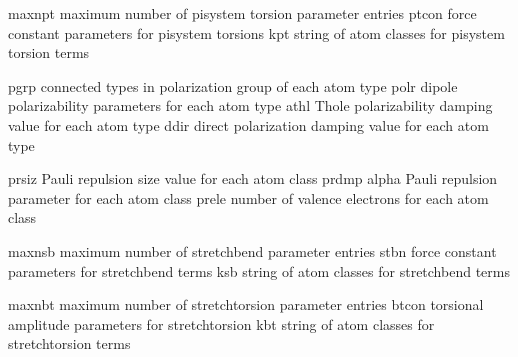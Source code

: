 \documentclass[letterpaper,11pt,english]{sphinxmanual}
\begin{document}

\begin{sphinxVerbatim}[commandchars=\\\{\}]
maxnpt          maximum number of pi\PYGZhy{}system torsion parameter entries
ptcon           force constant parameters for pi\PYGZhy{}system torsions
kpt             string of atom classes for pi\PYGZhy{}system torsion terms
\end{sphinxVerbatim}


\begin{sphinxVerbatim}[commandchars=\\\{\}]
pgrp            connected types in polarization group of each atom type
polr            dipole polarizability parameters for each atom type
athl            Thole polarizability damping value for each atom type
ddir            direct polarization damping value for each atom type
\end{sphinxVerbatim}


\begin{sphinxVerbatim}[commandchars=\\\{\}]
prsiz           Pauli repulsion size value for each atom class
prdmp           alpha Pauli repulsion parameter for each atom class
prele           number of valence electrons for each atom class
\end{sphinxVerbatim}


\begin{sphinxVerbatim}[commandchars=\\\{\}]
maxnsb          maximum number of stretch\PYGZhy{}bend parameter entries
stbn            force constant parameters for stretch\PYGZhy{}bend terms
ksb             string of atom classes for stretch\PYGZhy{}bend terms
\end{sphinxVerbatim}


\begin{sphinxVerbatim}[commandchars=\\\{\}]
maxnbt          maximum number of stretch\PYGZhy{}torsion parameter entries
btcon           torsional amplitude parameters for stretch\PYGZhy{}torsion
kbt             string of atom classes for stretch\PYGZhy{}torsion terms
\end{sphinxVerbatim}
\end{document}
